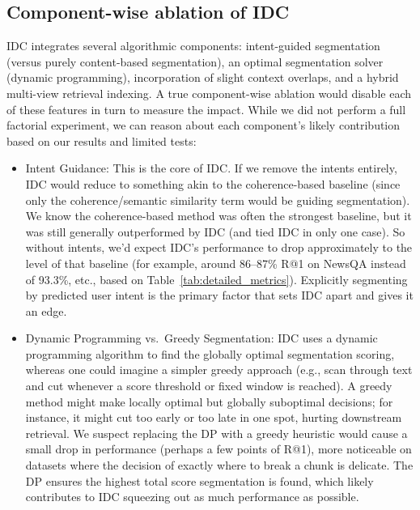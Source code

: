 \documentclass[12pt,a4paper]{report}
\begin{document}
\subsection{Component-wise ablation of IDC}\label{sec:component-ablation}

IDC integrates several algorithmic components: intent-guided segmentation (versus purely content-based segmentation), an optimal segmentation solver (dynamic programming), incorporation of slight context overlaps, and a hybrid multi-view retrieval indexing. A true component-wise ablation would disable each of these features in turn to measure the impact. While we did not perform a full factorial experiment, we can reason about each component's likely contribution based on our results and limited tests:

\begin{itemize}
\item Intent Guidance: This is the core of IDC. If we remove the intents entirely, IDC would reduce to something akin to the coherence-based baseline (since only the coherence/semantic similarity term would be guiding segmentation). We know the coherence-based method was often the strongest baseline, but it was still generally outperformed by IDC (and tied IDC in only one case). So without intents, we'd expect IDC's performance to drop approximately to the level of that baseline (for example, around 86--87\% R@1 on NewsQA instead of 93.3\%, etc., based on Table~\ref{tab:detailed_metrics}). Explicitly segmenting by predicted user intent is the primary factor that sets IDC apart and gives it an edge.

\item Dynamic Programming vs.\ Greedy Segmentation: IDC uses a dynamic programming algorithm to find the globally optimal segmentation scoring, whereas one could imagine a simpler greedy approach (e.g., scan through text and cut whenever a score threshold or fixed window is reached). A greedy method might make locally optimal but globally suboptimal decisions; for instance, it might cut too early or too late in one spot, hurting downstream retrieval. We suspect replacing the DP with a greedy heuristic would cause a small drop in performance (perhaps a few points of R@1), more noticeable on datasets where the decision of exactly where to break a chunk is delicate. The DP ensures the highest total score segmentation is found, which likely contributes to IDC squeezing out as much performance as possible.


\end{itemize}
\end{document}
